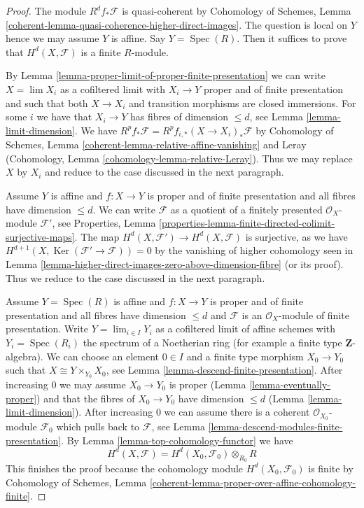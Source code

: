 \documentclass[10pt,a4paper]{amsart}
\theoremstyle{plain}
\theoremstyle{definition}
\theoremstyle{remark}
\numberwithin{equation}{subsection}
\def\lim{\mathop{\mathrm{lim}}\nolimits}
\def\Spec{\mathop{\mathrm{Spec}}}
\def\Ker{\mathop{\mathrm{Ker}}}
\begin{document}
\begin{proof}
The module $R^df_*\mathcal{F}$ is quasi-coherent by
Cohomology of Schemes, Lemma
\ref{coherent-lemma-quasi-coherence-higher-direct-images}.
The question is local on $Y$ hence we may assume $Y$ is affine.
Say $Y = \Spec(R)$. Then it suffices to prove that $H^d(X, \mathcal{F})$
is a finite $R$-module.

\medskip\noindent
By Lemma \ref{lemma-proper-limit-of-proper-finite-presentation}
we can write $X = \lim X_i$ as a cofiltered limit with $X_i \to Y$ proper
and of finite presentation and such that both $X \to X_i$
and transition morphisms are closed immersions.
For some $i$ we have that $X_i \to Y$ has fibres of dimension $\leq d$,
see Lemma \ref{lemma-limit-dimension}. We have
$R^pf_*\mathcal{F} = R^pf_{i, *}(X \to X_i)_*\mathcal{F}$ by
Cohomology of Schemes, Lemma \ref{coherent-lemma-relative-affine-vanishing}
and Leray (Cohomology, Lemma \ref{cohomology-lemma-relative-Leray}).
Thus we may replace $X$ by $X_i$ and
reduce to the case discussed in the next paragraph.

\medskip\noindent
Assume $Y$ is affine and $f : X \to Y$ is proper and of finite presentation
and all fibres have dimension $\leq d$.
We can write $\mathcal{F}$ as a quotient of a finitely presented
$\mathcal{O}_X$-module $\mathcal{F}'$, see
Properties, Lemma
\ref{properties-lemma-finite-directed-colimit-surjective-maps}.
The map $H^d(X, \mathcal{F}') \to H^d(X, \mathcal{F})$ is
surjective, as we have $H^{d + 1}(X, \Ker(\mathcal{F}' \to \mathcal{F})) = 0$
by the vanishing of higher cohomology seen in
Lemma \ref{lemma-higher-direct-images-zero-above-dimension-fibre}
(or its proof). Thus we reduce to the case discussed in the next paragraph.

\medskip\noindent
Assume $Y = \Spec(R)$ is affine and $f : X \to Y$
is proper and of finite presentation
and all fibres have dimension $\leq d$ and $\mathcal{F}$ is an
$\mathcal{O}_X$-module of finite presentation.
Write $Y = \lim_{i \in I} Y_i$ as a cofiltered limit of affine schemes
with $Y_i = \Spec(R_i)$ the spectrum of a Noetherian ring
(for example a finite type $\mathbf{Z}$-algebra).
We can choose an element $0 \in I$ and a finite type morphism
$X_0 \to Y_0$ such that $X \cong Y \times_{Y_0} X_0$, see
Lemma \ref{lemma-descend-finite-presentation}.
After increasing $0$ we may assume $X_0 \to Y_0$ is proper
(Lemma \ref{lemma-eventually-proper})
and that the fibres of $X_0 \to Y_0$ have dimension $\leq d$
(Lemma \ref{lemma-limit-dimension}).
After increasing $0$ we can assume there is a coherent
$\mathcal{O}_{X_0}$-module $\mathcal{F}_0$ which pulls
back to $\mathcal{F}$, see
Lemma \ref{lemma-descend-modules-finite-presentation}.
By Lemma \ref{lemma-top-cohomology-functor}
we have
$$
H^d(X, \mathcal{F}) = H^d(X_0, \mathcal{F}_0) \otimes_{R_0} R
$$
This finishes the proof because the cohomology module
$H^d(X_0, \mathcal{F}_0)$ is finite by
Cohomology of Schemes, Lemma
\ref{coherent-lemma-proper-over-affine-cohomology-finite}.
\end{proof}
\end{document}
